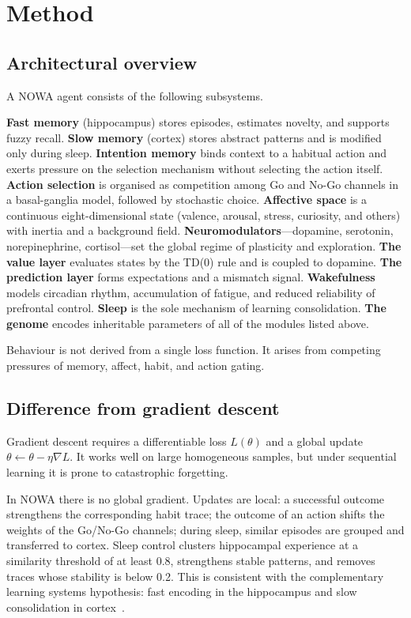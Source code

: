 \documentclass[11pt,a4paper]{article}
\begin{document}
\section{Method}

\subsection{Architectural overview}

A NOWA agent consists of the following subsystems.

\textbf{Fast memory} (hippocampus) stores episodes, estimates novelty, and supports fuzzy recall. \textbf{Slow memory} (cortex) stores abstract patterns and is modified only during sleep.
\textbf{Intention memory} binds context to a habitual action and exerts pressure on the selection mechanism without selecting the action itself.
\textbf{Action selection} is organised as competition among Go and No-Go channels in a basal-ganglia model, followed by stochastic choice.
\textbf{Affective space} is a continuous eight-dimensional state (valence, arousal, stress, curiosity, and others) with inertia and a background field.
\textbf{Neuromodulators}---dopamine, serotonin, norepinephrine, cortisol---set the global regime of plasticity and exploration.
\textbf{The value layer} evaluates states by the TD(0) rule and is coupled to dopamine.
\textbf{The prediction layer} forms expectations and a mismatch signal.
\textbf{Wakefulness} models circadian rhythm, accumulation of fatigue, and reduced reliability of prefrontal control.
\textbf{Sleep} is the sole mechanism of learning consolidation.
\textbf{The genome} encodes inheritable parameters of all of the modules listed above.

Behaviour is not derived from a single loss function. It arises from competing pressures of memory, affect, habit, and action gating.

\subsection{Difference from gradient descent}

Gradient descent requires a differentiable loss \(L(\theta)\) and a global update \(\theta \leftarrow \theta - \eta\nabla L\). It works well on large homogeneous samples, but under sequential learning it is prone to catastrophic forgetting.

In NOWA there is no global gradient. Updates are local: a successful outcome strengthens the corresponding habit trace; the outcome of an action shifts the weights of the Go/No-Go channels; during sleep, similar episodes are grouped and transferred to cortex. Sleep control clusters hippocampal experience at a similarity threshold of at least 0.8, strengthens stable patterns, and removes traces whose stability is below 0.2. This is consistent with the complementary learning systems hypothesis: fast encoding in the hippocampus and slow consolidation in cortex~\cite{mcclelland1995}.
\end{document}
